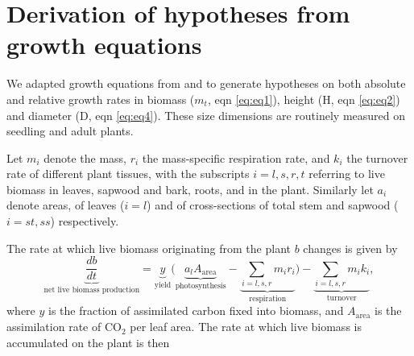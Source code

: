 \documentclass[a4paper]{article}\usepackage[]{graphicx}\usepackage[]{color}
\begin{document}
\begin{Appendix} \label{sec:textbox}

\renewcommand{\thefigure}{A\arabic{figure}}
\renewcommand{\thetable}{A\arabic{table}}

\setcounter{figure}{0}
\setcounter{table}{0}

\section{Derivation of hypotheses from growth equations}\label{app:growth}

We adapted growth equations from \cite{Falster:2011ii} and \cite{falster:2013} to generate hypotheses on both absolute and relative growth rates in biomass ($m_t$, eqn \ref{eq:eq1}), height (H, eqn \ref{eq:eq2}) and diameter (D, eqn \ref{eq:eq4}). These size dimensions are routinely measured on seedling and adult plants. 

Let $m_i$ denote the mass, $r_i$ the mass-specific respiration rate, and $k_i$ the turnover rate of different plant tissues, with the subscripts $i=l,s,r,t$ referring to live biomass in leaves, sapwood and bark, roots, and in the plant. Similarly let $a_i$ denote areas, of leaves ($i=l$) and of cross-sections of total stem and sapwood ($i= st,ss$) respectively.

The rate at which live biomass originating from the plant $b$ changes is given by
\begin{equation}\label{eq:eq0}
\underbrace{\frac{db}{dt}}_{\text{net live biomass production}} = \underbrace{y}_{\text{yield}}  \big(\underbrace{a_{l} A_{\textrm{area}}}_{\text{photosynthesis}} - \underbrace{\sum_{i=l,s,r} m_{i} r_{i}}_{\text{respiration}}\big) - \underbrace{ \sum_{i=l,s,r} m_{i} k_{i}}_{\text{turnover}},
\end{equation}
where $y$ is the fraction of assimilated carbon fixed into biomass,  and  $A_{\textrm{area}}$ is the assimilation rate of CO$_{2}$ per leaf area. The rate at which live biomass is accumulated on the plant is then


\end{Appendix}
\end{document}
